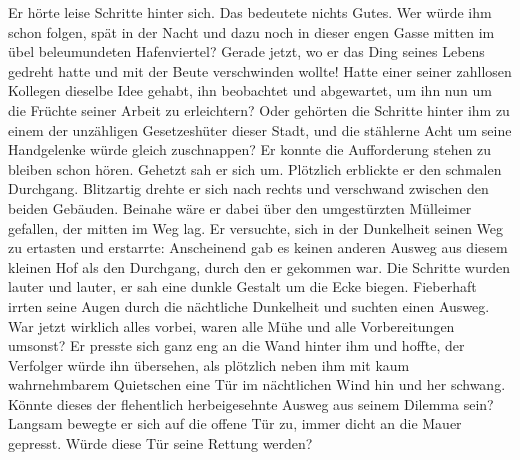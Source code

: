 \documentclass{scrreprt}
\begin{document}
Er hörte leise Schritte hinter sich. Das bedeutete nichts Gutes. Wer würde ihm schon folgen, spät in der Nacht und dazu noch in dieser engen Gasse mitten im übel beleumundeten Hafenviertel? Gerade jetzt, wo er das Ding seines Lebens gedreht hatte und mit der Beute verschwinden wollte! Hatte einer seiner zahllosen Kollegen dieselbe Idee gehabt, ihn beobachtet und abgewartet, um ihn nun um die Früchte seiner Arbeit zu erleichtern? Oder gehörten die Schritte hinter ihm zu einem der unzähligen Gesetzeshüter dieser Stadt, und die stählerne Acht um seine Handgelenke würde gleich zuschnappen? Er konnte die Aufforderung stehen zu bleiben schon hören. Gehetzt sah er sich um. Plötzlich erblickte er den schmalen Durchgang. Blitzartig drehte er sich nach rechts und verschwand zwischen den beiden Gebäuden. Beinahe wäre er dabei über den umgestürzten Mülleimer gefallen, der mitten im Weg lag. Er versuchte, sich in der Dunkelheit seinen Weg zu ertasten und erstarrte\cite{weranders}: Anscheinend gab es keinen anderen Ausweg aus diesem kleinen Hof als den Durchgang, durch den er gekommen war. Die Schritte wurden lauter und lauter, er sah eine dunkle Gestalt um die Ecke biegen. Fieberhaft irrten seine Augen durch die nächtliche Dunkelheit und suchten einen Ausweg. War jetzt wirklich alles vorbei, waren alle Mühe und alle Vorbereitungen umsonst? Er presste sich ganz eng an die Wand hinter ihm und hoffte, der Verfolger würde ihn übersehen, als plötzlich neben ihm mit kaum wahrnehmbarem Quietschen eine Tür im nächtlichen Wind hin und her schwang. Könnte dieses der flehentlich herbeigesehnte Ausweg aus seinem Dilemma sein? Langsam bewegte er sich auf die offene Tür zu, immer dicht an die Mauer gepresst. Würde diese Tür seine Rettung werden?
\end{document}
